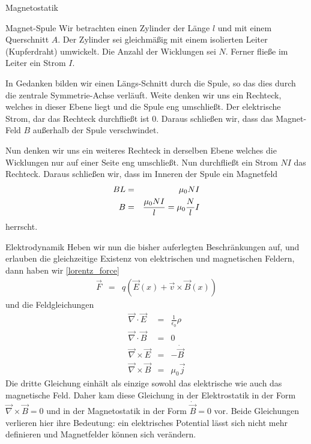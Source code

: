 \begin{chapter}{\titlestr}
\begin{section}{Magnetostatik}
\begin{subsection}{Magnet-Spule}
\label{magnetic_coil}
Wir betrachten einen Zylinder der Länge $l$ und mit einem Querschnitt $A$. Der Zylinder sei gleichmäßig mit einem isolierten Leiter (Kupferdraht) umwickelt.
Die Anzahl der Wicklungen sei $N$. Ferner fließe im Leiter ein Strom $I$.

In Gedanken bilden wir einen Längs-Schnitt durch die Spule, so das dies durch die zentrale Symmetrie-Achse verläuft. Weite denken wir uns ein Rechteck, welches in dieser Ebene liegt und die Spule eng umschließt.
Der elektrische Strom, dar das Rechteck durchfließt ist 0. Daraus schließen wir, dass das Magnet-Feld $B$ außerhalb der Spule verschwindet.

Nun denken wir uns ein weiteres Rechteck in derselben Ebene welches die Wicklungen nur auf einer Seite eng umschließt. Nun durchfließt ein Strom $NI$ das Rechteck. Daraus schließen wir, dass im Inneren der Spule
ein Magnetfeld
\begin{eqnarray}
\label{B_in_coil}
BL &=& \mu_0NI\cr
B &=& \frac{\mu_0NI}{l} =\mu_0\frac{N}{l}I
\end{eqnarray}
herrscht.
\end{subsection}
\end{section}

\begin{section}{Elektrodynamik}
Heben wir nun die bisher auferlegten Beschränkungen auf, und erlauben die gleichzeitige Existenz von elektrischen und magnetischen Feldern, dann haben wir \ref{lorentz_force}
\begin{eqnarray*}
\vec{F} &=& q\left(\vec{E}(x)+\vec{v}\times\vec{B}(x)\right)
\end{eqnarray*}
und die Feldgleichungen 
\begin{eqnarray*}
\vec{\nabla}\cdot\vec{E} &=& \frac{1}{\epsilon_0}\rho\\
\vec{\nabla}\cdot\vec{B} &=& 0\\
\vec{\nabla}\times\vec{E} &=& -\dot{\vec{B}}\\
\vec{\nabla}\times\vec{B} &=& \mu_0\vec{j}
\end{eqnarray*}
Die dritte Gleichung einhält als einzige sowohl das elektrische wie auch das magnetische Feld. Daher kam diese Gleichung in der Elektrostatik in der Form $\vec{\nabla}\times \vec{B} =0$ und in der Magnetostatik in der Form $\dot{\vec{B}}=0$ vor. Beide Gleichungen verlieren hier ihre Bedeutung: ein elektrisches Potential lässt sich nicht mehr definieren und Magnetfelder können sich verändern.


\end{section}
\end{chapter}
